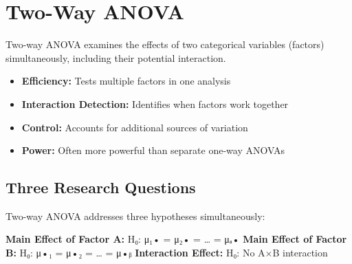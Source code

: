 \documentclass[
  11pt,
  letterpaper,
  oneside]{book}
\providecommand{\tightlist}{%
  \setlength{\itemsep}{0pt}\setlength{\parskip}{0pt}}\usepackage{longtable,booktabs,array}
\begin{document}
\section{Two-Way ANOVA}\label{two-way-anova}

Two-way ANOVA examines the effects of two categorical variables
(factors) simultaneously, including their potential interaction.

\begin{tcolorbox}[enhanced jigsaw, toprule=.15mm, left=2mm, opacitybacktitle=0.6, colframe=quarto-callout-note-color-frame, leftrule=.75mm, titlerule=0mm, coltitle=black, colbacktitle=quarto-callout-note-color!10!white, toptitle=1mm, title=\textcolor{quarto-callout-note-color}{\faInfo}\hspace{0.5em}{Advantages of Two-Way ANOVA}, bottomtitle=1mm, arc=.35mm, rightrule=.15mm, bottomrule=.15mm, breakable, opacityback=0, colback=white]

\begin{itemize}
\tightlist
\item
  \textbf{Efficiency:} Tests multiple factors in one analysis
\item
  \textbf{Interaction Detection:} Identifies when factors work together
\item
  \textbf{Control:} Accounts for additional sources of variation
\item
  \textbf{Power:} Often more powerful than separate one-way ANOVAs
\end{itemize}

\end{tcolorbox}

\subsection{Three Research Questions}\label{three-research-questions}

Two-way ANOVA addresses three hypotheses simultaneously:

\textbf{Main Effect of Factor A:} H₀: μ₁• = μ₂• = \ldots{} = μₐ•
\textbf{Main Effect of Factor B:} H₀: μ•₁ = μ•₂ = \ldots{} = μ•ᵦ
\textbf{Interaction Effect:} H₀: No A×B interaction
\end{document}
